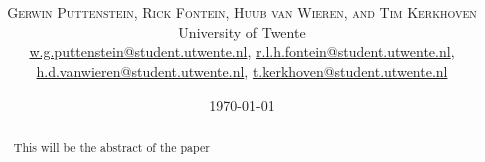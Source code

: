 \documentclass[twoside]{article}
\title{\vspace{-15mm}\fontsize{24pt}{10pt}\selectfont\textbf{\articletitle}} %
\author{
\large
\textsc{Gerwin Puttenstein, Rick Fontein, Huub van Wieren, and Tim Kerkhoven}\\[2mm] %
\normalsize University of Twente \\ %
\normalsize \href{mailto:w.g.puttenstein@student.utwente.nl}{w.g.puttenstein@student.utwente.nl}, 
\href{mailto:r.l.h.fontein@student.utwente.nl}{r.l.h.fontein@student.utwente.nl},\\
\normalsize \href{mailto:h.d.vanwieren@student.utwente.nl}{h.d.vanwieren@student.utwente.nl},
\href{mailto:t.kerkhoven@student.utwente.nl}{t.kerkhoven@student.utwente.nl}%
}
\date{\today}
\begin{document}
\thispagestyle{empty}
\maketitle %


\begin{abstract}

\noindent This will be the abstract of the paper

\end{abstract}

\end{document}
